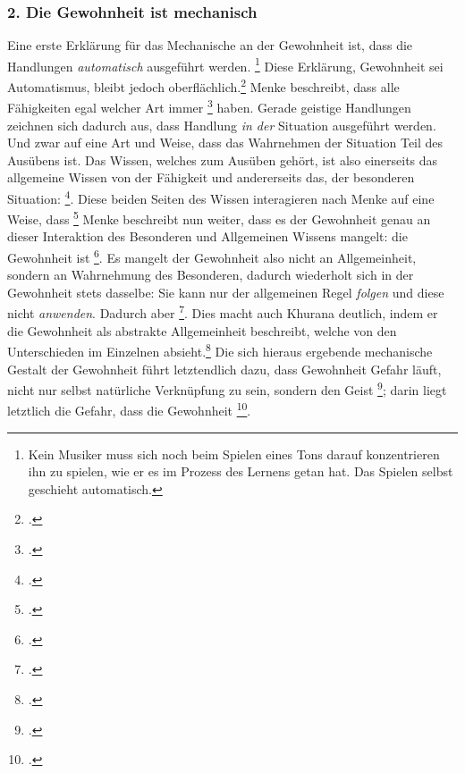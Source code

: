 \documentclass[12pt, a4paper, openany]{report}
\begin{document}
\subsubsection{2. Die Gewohnheit ist mechanisch}
Eine erste Erklärung für das Mechanische an der Gewohnheit ist, dass die Handlungen \emph{automatisch} ausgeführt werden.%
\footnote{
    Kein Musiker muss sich noch beim Spielen eines Tons darauf konzentrieren ihn zu spielen, wie er es im Prozess des Lernens getan hat. 
    Das Spielen selbst geschieht automatisch.
}
Diese Erklärung, Gewohnheit sei Automatismus, bleibt jedoch oberflächlich.\footcite[Vgl.][132]{menke_autonomie_2018}
Menke beschreibt, dass alle Fähigkeiten egal welcher Art immer \footcite[][132]{menke_autonomie_2018} haben. 
Gerade geistige Handlungen zeichnen sich dadurch aus, dass Handlung \emph{in der} Situation ausgeführt werden.
Und zwar auf eine Art und Weise, dass das Wahrnehmen der Situation Teil des Ausübens ist. 
Das Wissen, welches zum Ausüben gehört, ist also einerseits das allgemeine Wissen von der Fähigkeit und andererseits das, der besonderen Situation: \footcite[][133]{menke_autonomie_2018}.
Diese beiden Seiten des Wissen interagieren nach Menke auf eine Weise, dass \footcite[][133]{menke_autonomie_2018}
Menke beschreibt nun weiter, dass es der Gewohnheit genau an dieser Interaktion des Besonderen und Allgemeinen Wissens mangelt:
die Gewohnheit ist \footcite[][§ 410 Z, S. 188]{hegel_enzyklopädie_1969}.
Es mangelt der Gewohnheit also nicht an Allgemeinheit, sondern an Wahrnehmung des Besonderen, dadurch wiederholt sich in der Gewohnheit stets dasselbe:
Sie kann nur der allgemeinen Regel \emph{folgen} und diese nicht \emph{anwenden}. 
Dadurch aber \footcite[][134]{menke_autonomie_2018}.
Dies macht auch Khurana deutlich, indem er die Gewohnheit als abstrakte Allgemeinheit beschreibt, welche von den Unterschieden im Einzelnen absieht.\footcite[Vgl.][431]{khurana_freiheit_2017}
Die sich hieraus ergebende mechanische Gestalt der Gewohnheit führt letztendlich dazu, dass Gewohnheit Gefahr läuft, nicht nur selbst natürliche Verknüpfung zu sein, sondern den Geist \footcite[][430]{khurana_freiheit_2017};
darin liegt letztlich die Gefahr, dass die Gewohnheit \footcite[189]{khurana_freiheit_2017}.\\
\end{document}
